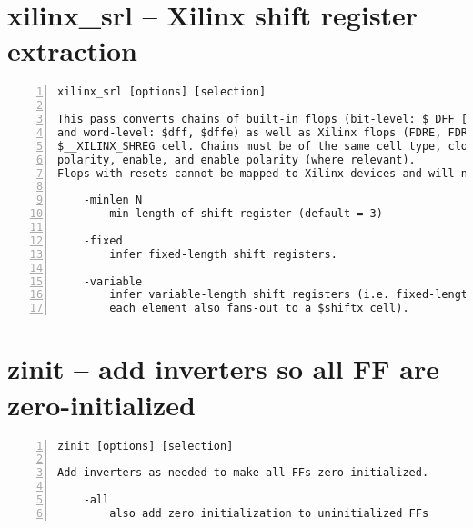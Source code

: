 \section{xilinx\_srl -- Xilinx shift register extraction}
\label{cmd:xilinx_srl}
\begin{lstlisting}[numbers=left,frame=single]
    xilinx_srl [options] [selection]

This pass converts chains of built-in flops (bit-level: $_DFF_[NP]_, $_DFFE_*
and word-level: $dff, $dffe) as well as Xilinx flops (FDRE, FDRE_1) into a
$__XILINX_SHREG cell. Chains must be of the same cell type, clock, clock
polarity, enable, and enable polarity (where relevant).
Flops with resets cannot be mapped to Xilinx devices and will not be inferred.

    -minlen N
        min length of shift register (default = 3)

    -fixed
        infer fixed-length shift registers.

    -variable
        infer variable-length shift registers (i.e. fixed-length shifts where
        each element also fans-out to a $shiftx cell).
\end{lstlisting}

\section{zinit -- add inverters so all FF are zero-initialized}
\label{cmd:zinit}
\begin{lstlisting}[numbers=left,frame=single]
    zinit [options] [selection]

Add inverters as needed to make all FFs zero-initialized.

    -all
        also add zero initialization to uninitialized FFs
\end{lstlisting}


